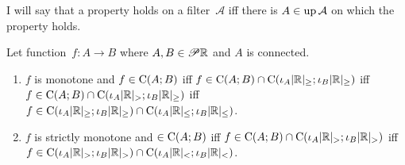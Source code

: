 I will say that a property holds on a filter~$\mathcal{A}$ iff there is $A\in\operatorname{up}\mathcal{A}$ on which the property holds.


\begin{lem}
Let function~$f:A\rightarrow B$ where $A,B\in\mathscr{P}\mathbb{R}$ and $A$ is connected.
\begin{enumerate}
\item $f$ is monotone and $f\in\mathrm{C}(A;B)$ iff
$f\in\mathrm{C}(A;B)\cap\mathrm{C}(\iota_A|\mathbb{R}|_{\geq};\iota_B|\mathbb{R}|_{\geq})$ iff
$f\in\mathrm{C}(A;B)\cap\mathrm{C}(\iota_A|\mathbb{R}|_{>};\iota_B|\mathbb{R}|_{\geq})$ iff
$f\in\mathrm{C}(\iota_A|\mathbb{R}|_{\geq};\iota_B|\mathbb{R}|_{\geq})\cap
\mathrm{C}(\iota_A|\mathbb{R}|_{\leq};\iota_B|\mathbb{R}|_{\leq})$.
\item $f$ is strictly monotone and $\in\mathrm{C}(A;B)$ iff
$f\in\mathrm{C}(A;B)\cap\mathrm{C}(\iota_A|\mathbb{R}|_{>};\iota_B|\mathbb{R}|_{>})$ iff
$f\in\mathrm{C}(\iota_A|\mathbb{R}|_{>};\iota_B|\mathbb{R}|_{>})\cap
\mathrm{C}(\iota_A|\mathbb{R}|_{<};\iota_B|\mathbb{R}|_{<})$.
\end{enumerate}
\end{lem}

